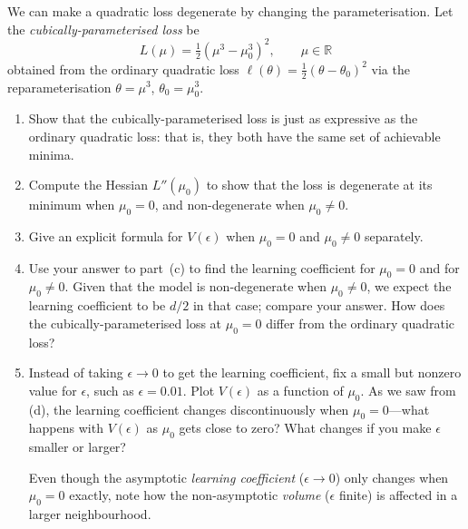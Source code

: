 \documentclass[11pt]{article}
\newcommand{\R}{\mathbb{R}}
\begin{document}
\begin{exercise}
\label{ex:cubic-parameterisation}
    We can make a quadratic loss degenerate by changing the parameterisation. Let the \emph{cubically-parameterised loss} be
    \begin{equation}
        L(\mu) = \tfrac{1}{2}(\mu^3 - \mu_0^3)^2, \qquad \mu \in \R
    \end{equation}
    obtained from the ordinary quadratic loss $\ell(\theta) = \frac{1}{2}(\theta - \theta_0)^2$ via the reparameterisation $\theta = \mu^3$, $\theta_0 = \mu_0^3$. 
    
    \begin{enumerate}
        \item
            Show that the cubically-parameterised loss is just as expressive as the ordinary quadratic loss: that is, they both have the same set of achievable minima.
        \item
            Compute the Hessian $L''(\mu_0)$ to show that the loss is degenerate at its minimum when $\mu_0 = 0$, and non-degenerate when $\mu_0 \neq 0$.
        \item
            Give an explicit formula for $V(\epsilon)$ when $\mu_0 = 0$ and $\mu_0 \neq 0$ separately.
        \item
            \label{ex:cubic-parameterisation:d}
            Use your answer to part~(c) to find the learning coefficient for $\mu_0=0$ and for $\mu_0\neq0$. Given that the model is non-degenerate when $\mu_0 \neq 0$, we expect the learning coefficient to be $d/2$ in that case; compare your answer. How does the cubically-parameterised loss at $\mu_0 = 0$ differ from the ordinary quadratic loss?
        \item
            \label{ex:cubic-parameterisation:e}
            Instead of taking $\epsilon \to 0$ to get the learning coefficient, fix a small but nonzero value for $\epsilon$, such as $\epsilon = 0.01$. Plot $V(\epsilon)$ as a function of $\mu_0$. As we saw from (d), the learning coefficient changes discontinuously when $\mu_0 = 0$---what happens with $V(\epsilon)$ as $\mu_0$ gets close to zero? What changes if you make $\epsilon$ smaller or larger?

        Even though the asymptotic \emph{learning coefficient} ($\epsilon \to 0$) only changes when $\mu_0 = 0$ exactly, note how the non-asymptotic \emph{volume} ($\epsilon$ finite) is affected in a larger neighbourhood.
    \end{enumerate}
\end{exercise}
\end{document}

